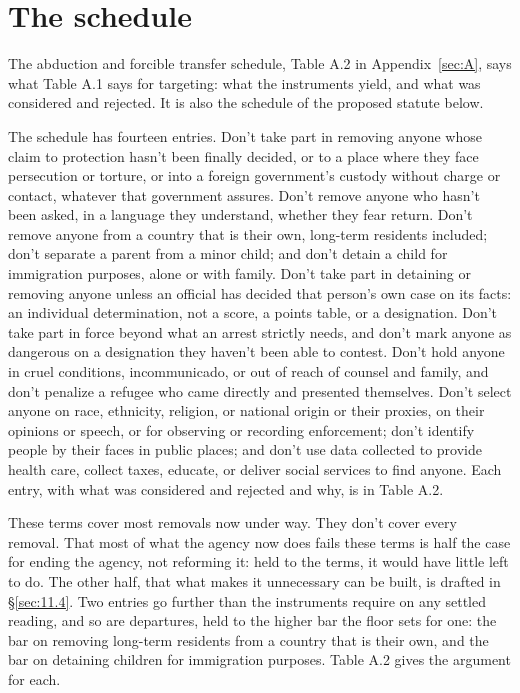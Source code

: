 \section{The schedule}
\label{sec:11.2}
The abduction and forcible transfer schedule, Table A.2 in Appendix~\ref{sec:A}, says what Table A.1 says for targeting: what the instruments yield, and what was considered and rejected. It is also the schedule of the proposed statute below.

The schedule has fourteen entries. Don't take part in removing anyone whose claim to protection hasn't been finally decided, or to a place where they face persecution or torture, or into a foreign government's custody without charge or contact, whatever that government assures. Don't remove anyone who hasn't been asked, in a language they understand, whether they fear return. Don't remove anyone from a country that is their own, long-term residents included; don't separate a parent from a minor child; and don't detain a child for immigration purposes, alone or with family. Don't take part in detaining or removing anyone unless an official has decided that person's own case on its facts: an individual determination, not a score, a points table, or a designation. Don't take part in force beyond what an arrest strictly needs, and don't mark anyone as dangerous on a designation they haven't been able to contest. Don't hold anyone in cruel conditions, incommunicado, or out of reach of counsel and family, and don't penalize a refugee who came directly and presented themselves. Don't select anyone on race, ethnicity, religion, or national origin or their proxies, on their opinions or speech, or for observing or recording enforcement; don't identify people by their faces in public places; and don't use data collected to provide health care, collect taxes, educate, or deliver social services to find anyone. Each entry, with what was considered and rejected and why, is in Table A.2.

These terms cover most removals now under way. They don't cover every removal.
That most of what the agency now does fails these terms is half the case for ending the agency, not reforming it: held to the terms, it would have little left to do. The other half, that what makes it unnecessary can be built, is drafted in \S\ref{sec:11.4}. Two entries go further than the instruments require on any settled reading, and so are departures, held to the higher bar the floor sets for one: the bar on removing long-term residents from a country that is their own, and the bar on detaining children for immigration purposes. Table A.2 gives the argument for each.

